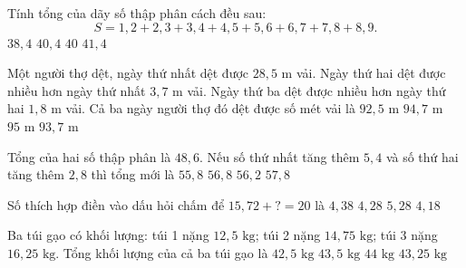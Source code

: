 \begin{ex} %
Tính tổng của dãy số thập phân cách đều sau:
\[
S = 1{,}2 + 2{,}3 + 3{,}4 + 4{,}5 + 5{,}6 + 6{,}7 + 7{,}8 + 8{,}9.
\]
\choice
{$38{,}4$}
{\True $40{,}4$}
{$40$}
{$41{,}4$}
\end{ex}

\begin{ex} %
Một người thợ dệt, ngày thứ nhất dệt được $28{,}5\text{ m}$ vải. Ngày thứ hai dệt được nhiều hơn ngày thứ nhất $3{,}7\text{ m}$ vải. Ngày thứ ba dệt được nhiều hơn ngày thứ hai $1{,}8\text{ m}$ vải. Cả ba ngày người thợ đó dệt được số mét vải là
\choice
{$92{,}5\text{ m}$}
{\True $94{,}7\text{ m}$}
{$95\text{ m}$}
{$93{,}7\text{ m}$}
\end{ex}

\begin{ex} %
Tổng của hai số thập phân là $48{,}6$. Nếu số thứ nhất tăng thêm $5{,}4$ và số thứ hai tăng thêm $2{,}8$ thì tổng mới là
\choice
{$55{,}8$}
{\True $56{,}8$}
{$56{,}2$}
{$57{,}8$}
\end{ex}

\begin{ex} %
Số thích hợp điền vào dấu hỏi chấm để $15{,}72 + ? = 20$ là
\choice
{$4{,}38$}
{\True $4{,}28$}
{$5{,}28$}
{$4{,}18$}
\end{ex}

\begin{ex} %
Ba túi gạo có khối lượng: túi 1 nặng $12{,}5\text{ kg}$; túi 2 nặng $14{,}75\text{ kg}$; túi 3 nặng $16{,}25\text{ kg}$. Tổng khối lượng của cả ba túi gạo là
\choice
{$42{,}5\text{ kg}$}
{\True $43{,}5\text{ kg}$}
{$44\text{ kg}$}
{$43{,}25\text{ kg}$}
\end{ex}

